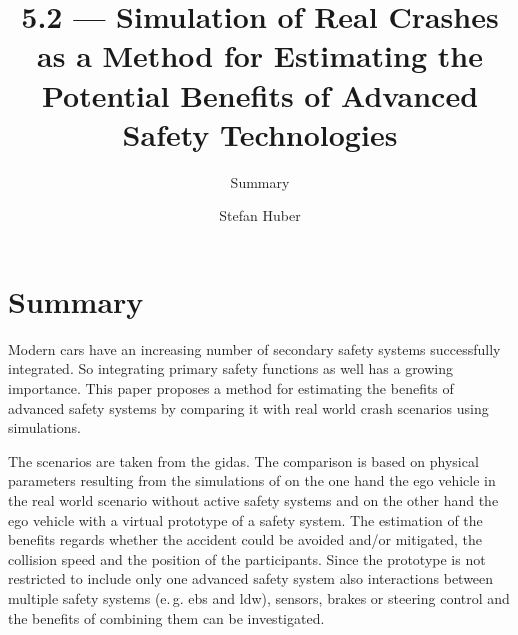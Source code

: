 \documentclass[oneside, notitlepage, twocolumn]{scrartcl}
\title{\LARGE 5.2 --- Simulation of Real Crashes as a Method for Estimating the Potential Benefits of Advanced Safety Technologies}
\subtitle{Summary}
\author{Stefan Huber}
\newcommand{\eg}{e.\,g.\xspace}
\begin{document}
\maketitle

\section{Summary}
Modern cars have an increasing number of secondary safety systems successfully integrated.
So integrating primary safety functions as well has a growing importance.
This paper proposes a method for estimating the benefits of advanced safety systems by comparing it with real world crash scenarios using simulations.\par
The scenarios are taken from the \gls{gidas}.
The comparison is based on physical parameters resulting from the simulations of on the one hand the ego vehicle in the real world scenario without active safety systems and on the other hand the ego vehicle with a virtual prototype of a safety system.
The estimation of the benefits regards whether the accident could be avoided and/or mitigated, the collision speed and the position of the participants.
Since the prototype is not restricted to include only one advanced safety system also interactions between multiple safety systems (\eg{} \gls{ebs} and \gls{ldw}), sensors, brakes or steering control and the benefits of combining them can be investigated.
\end{document}
